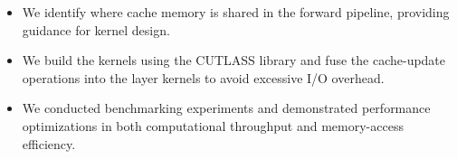\begin{itemize}
    \item We identify where cache memory is shared in the forward pipeline, providing guidance for kernel design.
    \item We build the kernels using the CUTLASS library and fuse the cache-update operations into the layer kernels to avoid excessive I/O overhead.
    \item We conducted benchmarking experiments and demonstrated performance optimizations in both computational throughput and memory-access efficiency.
\end{itemize}

